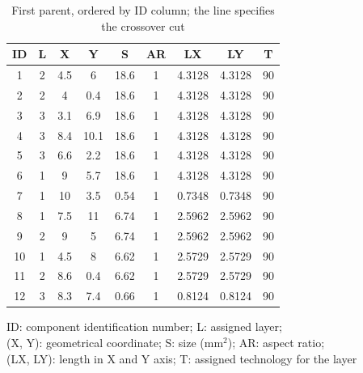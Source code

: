 \begin{table}[pt]
\caption{First parent, ordered by ID column; the line specifies the crossover cut}
\begin{center}
\begin{scriptsize}
\begin{tabular}{|c|c|c|c|c|c|c|c|c|}
\hline ID & L & X & Y & S & AR & LX & LY & T\\
\hline 1 & 2 & 4.5 & 6 & 18.6 & 1 & 4.3128 & 4.3128 & 90\\
2 & 2 & 4 & 0.4 & 18.6 & 1 & 4.3128 & 4.3128 & 90\\
3 & 3 & 3.1 & 6.9 & 18.6 & 1 & 4.3128 & 4.3128 & 90\\
4 & 3 & 8.4 & 10.1 & 18.6 & 1 & 4.3128 & 4.3128 & 90\\
5 & 3 & 6.6 & 2.2 & 18.6 & 1 & 4.3128 & 4.3128 & 90\\
6 & 1 & 9 & 5.7 & 18.6 & 1 & 4.3128 & 4.3128 & 90\\
7 & 1 & 10 & 3.5 & 0.54 & 1 & 0.7348 & 0.7348 & 90\\
\hline
\hline
8 & 1 & 7.5 & 11 & 6.74 & 1 & 2.5962 & 2.5962 & 90\\
9 & 2 & 9 & 5 & 6.74 & 1 & 2.5962 & 2.5962 & 90\\
10 & 1 & 4.5 & 8 & 6.62 & 1 & 2.5729 & 2.5729 & 90\\
11 & 2 & 8.6 & 0.4 & 6.62 & 1 & 2.5729 & 2.5729 & 90\\
12 & 3 & 8.3 & 7.4 & 0.66 & 1 & 0.8124 & 0.8124 & 90\\
\hline
\end{tabular}
\end{scriptsize}
\end{center}
\begin{center}
\begin{scriptsize}
ID: component identification number; L: assigned layer;\\
(X, Y): geometrical coordinate; S: size (mm$^2$); AR: aspect ratio;\\
(LX, LY): length in X and Y axis; T: assigned technology for the layer
\end{scriptsize}
\end{center}
\label{tab:firstparentIDrow}
\end{table}

